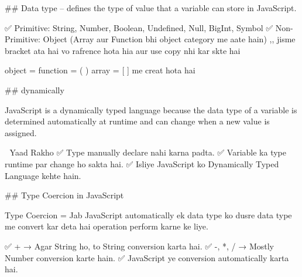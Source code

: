 ## Data type -- defines the type of value that a variable can store in JavaScript.

✅ Primitive: String, Number, Boolean, Undefined, Null, BigInt, Symbol
✅ Non-Primitive: Object (Array aur Function bhi object category me aate hain) ,, jisme bracket ata hai vo rafrence hota hia aur use copy nhi kar skte hai 

object = { }
function = ( )
array  = [ ]
me creat hota hai 

##  dynamically

JavaScript is a dynamically typed language because the data type of a variable is determined automatically at runtime and can change when a new value is assigned.

🎯 Yaad Rakho
✅ Type manually declare nahi karna padta.
✅ Variable ka type runtime par change ho sakta hai.
✅ Isliye JavaScript ko Dynamically Typed Language kehte hain.

## Type Coercion in JavaScript

Type Coercion = Jab JavaScript automatically ek data type ko dusre data type me convert kar deta hai operation perform karne ke liye.

✅ + → Agar String ho, to String conversion karta hai.
✅ -, *, / → Mostly Number conversion karte hain.
✅ JavaScript ye conversion automatically karta hai.
